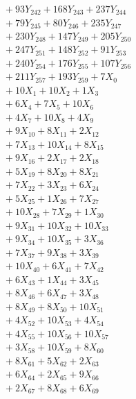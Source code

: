 \documentclass[a4paper,10pt]{article}
\begin{document}
{\begin{align}
&\;  + 93 Y_{242} + 168 Y_{243} + 237 Y_{244} \\[0.3ex]
&\;  + 79 Y_{245} + 80 Y_{246} + 235 Y_{247} \\[0.3ex]
&\;  + 230 Y_{248} + 147 Y_{249} + 205 Y_{250} \\[0.3ex]
&\;  + 247 Y_{251} + 148 Y_{252} + 91 Y_{253} \\[0.3ex]
&\;  + 240 Y_{254} + 176 Y_{255} + 107 Y_{256} \\[0.3ex]
&\;  + 211 Y_{257} + 193 Y_{259} + 7 X_{0} \\[0.3ex]
&\;  + 10 X_{1} + 10 X_{2} + 1 X_{3} \\[0.3ex]
&\;  + 6 X_{4} + 7 X_{5} + 10 X_{6} \\[0.3ex]
&\;  + 4 X_{7} + 10 X_{8} + 4 X_{9} \\[0.5ex]\allowbreak
&\;  + 9 X_{10} + 8 X_{11} + 2 X_{12} \\[0.3ex]
&\;  + 7 X_{13} + 10 X_{14} + 8 X_{15} \\[0.3ex]
&\;  + 9 X_{16} + 2 X_{17} + 2 X_{18} \\[0.3ex]
&\;  + 5 X_{19} + 8 X_{20} + 8 X_{21} \\[0.3ex]
&\;  + 7 X_{22} + 3 X_{23} + 6 X_{24} \\[0.3ex]
&\;  + 5 X_{25} + 1 X_{26} + 7 X_{27} \\[0.3ex]
&\;  + 10 X_{28} + 7 X_{29} + 1 X_{30} \\[0.3ex]
&\;  + 9 X_{31} + 10 X_{32} + 10 X_{33} \\[0.3ex]
&\;  + 9 X_{34} + 10 X_{35} + 3 X_{36} \\[0.3ex]
&\;  + 7 X_{37} + 9 X_{38} + 3 X_{39} \\[0.5ex]\allowbreak
&\;  + 10 X_{40} + 6 X_{41} + 7 X_{42} \\[0.3ex]
&\;  + 6 X_{43} + 1 X_{44} + 3 X_{45} \\[0.3ex]
&\;  + 8 X_{46} + 6 X_{47} + 3 X_{48} \\[0.3ex]
&\;  + 8 X_{49} + 8 X_{50} + 10 X_{51} \\[0.3ex]
&\;  + 4 X_{52} + 10 X_{53} + 4 X_{54} \\[0.3ex]
&\;  + 4 X_{55} + 10 X_{56} + 10 X_{57} \\[0.3ex]
&\;  + 3 X_{58} + 10 X_{59} + 8 X_{60} \\[0.3ex]
&\;  + 8 X_{61} + 5 X_{62} + 2 X_{63} \\[0.3ex]
&\;  + 6 X_{64} + 2 X_{65} + 9 X_{66} \\[0.3ex]
&\;  + 2 X_{67} + 8 X_{68} + 6 X_{69} \\[0.5ex]\allowbreak

\end{align}}
\end{document}
